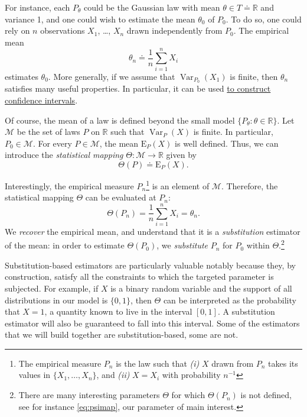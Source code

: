 \documentclass[11pt,openright,twoside]{book}
\DeclareMathOperator{\Var}{Var}
\newcommand{\bbR}{\mathbb{R}}
\newcommand{\defq}{\doteq}
\newcommand{\calM}{\mathcal{M}}
\newcommand{\Exp}{\textrm{E}}
\theoremstyle{definition}
\theoremstyle{definition}
\theoremstyle{definition}
\theoremstyle{remark}
\begin{document}
For instance, each \(P_{\theta}\) could be the Gaussian law with mean \(\theta \in T \defq \bbR\) and variance 1, and one could wish to estimate the mean
\(\theta_{0}\) of \(P_{0}\). To do so, one could rely on \(n\) observations \(X_{1}\),
\ldots, \(X_{n}\) drawn independently from \(P_{0}\). The empirical mean
\begin{equation*}\theta_{n}       \defq      \frac{1}{n}       \sum_{i=1}^{n}
X_{i}\end{equation*} estimates \(\theta_{0}\). More generally, if we assume that \(\Var_{P_{0}} (X_{1})\) is finite, then \(\theta_{n}\) satisfies many useful properties. In
particular, it can be used \protect\hyperlink{clt}{to construct confidence intervals}.

Of course, the mean of a law is defined beyond the small model \(\{P_{\theta} : \theta \in \bbR\}\). Let \(\calM\) be the set of laws \(P\) on \(\bbR\) such that
\(\Var_{P}(X)\) is finite. In particular, \(P_{0} \in \calM\). For every \(P \in \calM\), the mean \(\Exp_{P}(X)\) is well defined. Thus, we can introduce the
\emph{statistical mapping} \(\Theta : \calM \to \bbR\) given by
\begin{equation*}\Theta(P) \defq \Exp_{P}(X).\end{equation*}

Interestingly, the empirical measure \(P_{n}\)\footnote{The empirical measure \(P_{n}\) is
  the law such that \emph{(i)} \(X\) drawn from \(P_{n}\) takes its values in \(\{X_{1}, \ldots, X_{n}\}\), and \emph{(ii)} \(X=X_{i}\) with probability \(n^{-1}\)} is an
element of \(\calM\). Therefore, the statistical mapping \(\Theta\) can be
evaluated at \(P_{n}\): \begin{equation*}\Theta(P_{n})    =   \frac{1}{n}
\sum_{i=1}^{n} X_{i}  = \theta_{n}.\end{equation*} We \emph{recover} the empirical
mean, and understand that it is a \emph{substitution} estimator of the mean: in
order to estimate \(\Theta(P_{0})\), we \emph{substitute} \(P_{n}\) for \(P_{0}\) within
\(\Theta\).\footnote{There are many interesting parameters \(\Theta\) for which
  \(\Theta(P_n)\) is not defined, see for instance \eqref{eq:psimap}, our parameter
  of main interest.}

Substitution-based estimators are particularly valuable notably because they,
by construction, satisfy all the constraints to which the targeted parameter
is subjected. For example, if \(X\) is a binary random variable and the support
of all distributions in our model is \(\{0,1\}\), then \(\Theta\) can be
interpreted as the probability that \(X = 1\), a quantity known to live in the
interval \([0,1]\). A substitution estimator will also be guaranteed to fall
into this interval. Some of the estimators that we will build together are
substitution-based, some are not.
\end{document}
